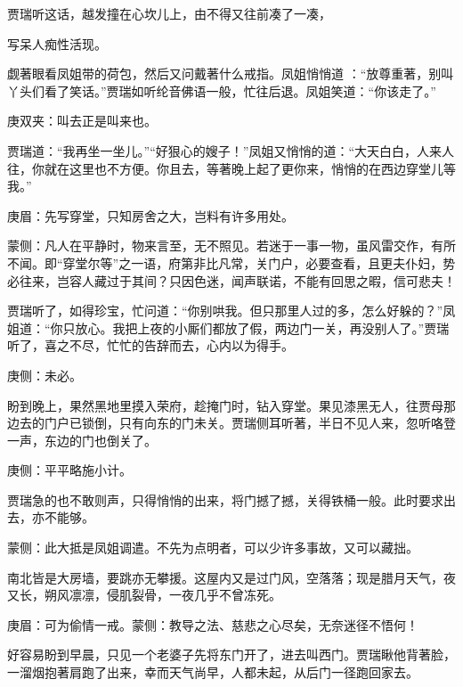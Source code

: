 \begin{parag}
    贾瑞听这话，越发撞在心坎儿上，由不得又往前凑了一凑，\begin{note}写呆人痴性活现。\end{note}觑著眼看凤姐带的荷包，然后又问戴著什么戒指。凤姐悄悄道 ：“放尊重著，别叫丫头们看了笑话。”贾瑞如听纶音佛语一般，忙往后退。凤姐笑道：“你该走了。”\begin{note}庚双夹：叫去正是叫来也。\end{note}贾瑞道：“我再坐一坐儿。”“好狠心的嫂子！”凤姐又悄悄的道：“大天白白，人来人往，你就在这里也不方便。你且去，等著晚上起了更你来，悄悄的在西边穿堂儿等我。”\begin{note}庚眉：先写穿堂，只知房舍之大，岂料有许多用处。\end{note}\begin{note}蒙侧：凡人在平静时，物来言至，无不照见。若迷于一事一物，虽风雷交作，有所不闻。即“穿堂尔等”之一语，府第非比凡常，关门户，必要查看，且更夫仆妇，势必往来，岂容人藏过于其间？只因色迷，闻声联诺，不能有回思之暇，信可悲夫！\end{note}贾瑞听了，如得珍宝，忙问道：“你别哄我。但只那里人过的多，怎么好躲的？”凤姐道：“你只放心。我把上夜的小厮们都放了假，两边门一关，再没别人了。”贾瑞听了，喜之不尽，忙忙的告辞而去，心内以为得手。\begin{note}庚侧：未必。\end{note}
\end{parag}


\begin{parag}
    盼到晚上，果然黑地里摸入荣府，趁掩门时，钻入穿堂。果见漆黑无人，往贾母那边去的门户已锁倒，只有向东的门未关。贾瑞侧耳听著，半日不见人来，忽听咯登一声，东边的门也倒关了。\begin{note}庚侧：平平略施小计。\end{note}贾瑞急的也不敢则声，只得悄悄的出来，将门撼了撼，关得铁桶一般。此时要求出去，亦不能够。\begin{note}蒙侧：此大抵是凤姐调遣。不先为点明者，可以少许多事故，又可以藏拙。\end{note}南北皆是大房墙，要跳亦无攀援。这屋内又是过门风，空落落；现是腊月天气，夜又长，朔风凛凛，侵肌裂骨，一夜几乎不曾冻死。\begin{note}庚眉：可为偷情一戒。蒙侧：教导之法、慈悲之心尽矣，无奈迷径不悟何！\end{note}好容易盼到早晨，只见一个老婆子先将东门开了，进去叫西门。贾瑞瞅他背著脸，一溜烟抱著肩跑了出来，幸而天气尚早，人都未起，从后门一径跑回家去。
\end{parag}


